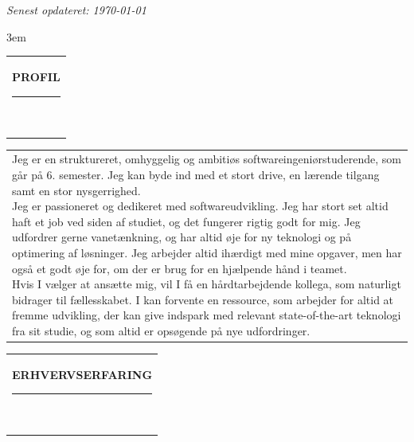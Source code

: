 \documentclass[10pt,A4]{article}
\newcommand{\mpwidth}{\linewidth-\fboxsep-\fboxsep}
\newcommand{\cvtext}[1] {
	\begin{tabular*}{1\mpwidth}{p{1\mpwidth}}
		\parbox{1\mpwidth}{#1}
	\end{tabular*}
}
\newcommand{\cvsection}[1] {
	\vspace{14pt}
	\cvtext{
		\textbf{\huge{\textcolor{darkcol}{\uppercase{#1}}}}\\[-4pt]
		\textcolor{maincol}{ \rule{0.1\textwidth}{2pt} } \\
	}
}
\begin{document}
\begin{paracol}{2}
\begin{rightcolumn}
\textit{Senest opdateret: \today}

\vfill\null
\emergencystretch 3em
\cvsection{PROFIL}

\cvtext{Jeg er en struktureret, omhyggelig og ambitiøs softwareingeniørstuderende, som går på 6. semester. Jeg kan byde ind med et stort drive, en lærende tilgang samt en stor nysgerrighed.\\

Jeg er passioneret og dedikeret med softwareudvikling. Jeg har stort set altid haft et job ved siden af studiet, og det fungerer rigtig godt for mig. Jeg udfordrer gerne vanetænkning, og har altid øje for ny teknologi og på optimering af løsninger. Jeg arbejder altid ihærdigt med mine opgaver, men har også et godt øje for, om der er brug for en hjælpende hånd i teamet.\\

Hvis I vælger at ansætte mig, vil I få en hårdtarbejdende kollega, som naturligt bidrager til fællesskabet. I kan forvente en ressource, som arbejder for altid at fremme udvikling, der kan give indspark med relevant state-of-the-art teknologi fra sit studie, og som altid er opsøgende på nye udfordringer.
}

\vfill\null
\cvsection{ERHVERVSERFARING}


\end{rightcolumn}
\end{paracol}
\end{document}
